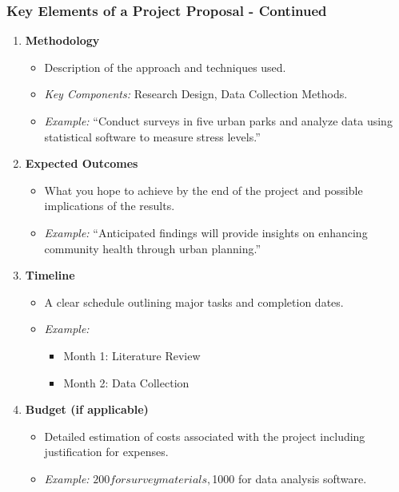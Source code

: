 \documentclass[aspectratio=169]{beamer}
\begin{document}
\begin{frame}[fragile]
    \frametitle{Key Elements of a Project Proposal - Continued}
    \begin{enumerate}[resume]
        \item \textbf{Methodology}
            \begin{itemize}
                \item Description of the approach and techniques used.
                \item \textit{Key Components: } Research Design, Data Collection Methods.
                \item \textit{Example:} “Conduct surveys in five urban parks and analyze data using statistical software to measure stress levels.”
            \end{itemize}

        \item \textbf{Expected Outcomes}
            \begin{itemize}
                \item What you hope to achieve by the end of the project and possible implications of the results.
                \item \textit{Example:} “Anticipated findings will provide insights on enhancing community health through urban planning.”
            \end{itemize}

        \item \textbf{Timeline}
            \begin{itemize}
                \item A clear schedule outlining major tasks and completion dates.
                \item \textit{Example:}
                    \begin{itemize}
                        \item Month 1: Literature Review
                        \item Month 2: Data Collection
                    \end{itemize}
            \end{itemize}
        
        \item \textbf{Budget (if applicable)}
            \begin{itemize}
                \item Detailed estimation of costs associated with the project including justification for expenses.
                \item \textit{Example:} $200 for survey materials, $1000 for data analysis software.
            \end{itemize}
        

\end{enumerate}
\end{frame}
\end{document}
